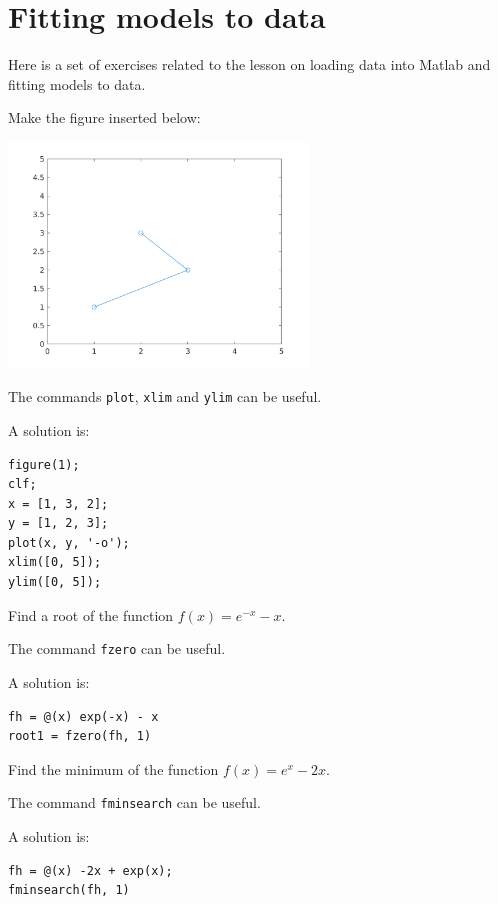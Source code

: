 \section{Fitting models to data}

Here is a set of exercises related to the lesson
on loading data into Matlab and fitting models to data.

\begin{ex}
Make the figure inserted below: \par
\noindent
\includegraphics[width=8cm]{pic/basic_plotting_010.png}
\begin{hint}
The commands \verb!plot!, \verb!xlim! and \verb!ylim! can be useful.
\end{hint}
\begin{sol}
A solution is:
\begin{verbatim}
figure(1);
clf;
x = [1, 3, 2];
y = [1, 2, 3];
plot(x, y, '-o');
xlim([0, 5]);
ylim([0, 5]);
\end{verbatim}
\end{sol}
\end{ex}

\begin{ex}
Find a root of the function $f(x) = e^{-x} - x$.
\begin{hint}
The command \verb!fzero! can be useful.
\end{hint}
\begin{sol}
A solution is:
\begin{verbatim}
fh = @(x) exp(-x) - x
root1 = fzero(fh, 1)
\end{verbatim}
\end{sol}
\end{ex}

\begin{ex}
Find the minimum of the function $f(x) = e^x - 2x$.
\begin{hint}
The command \verb!fminsearch! can be useful.
\end{hint}
\begin{sol}
A solution is:
\begin{verbatim}
fh = @(x) -2x + exp(x);
fminsearch(fh, 1)
\end{verbatim}
\end{sol}
\end{ex}




